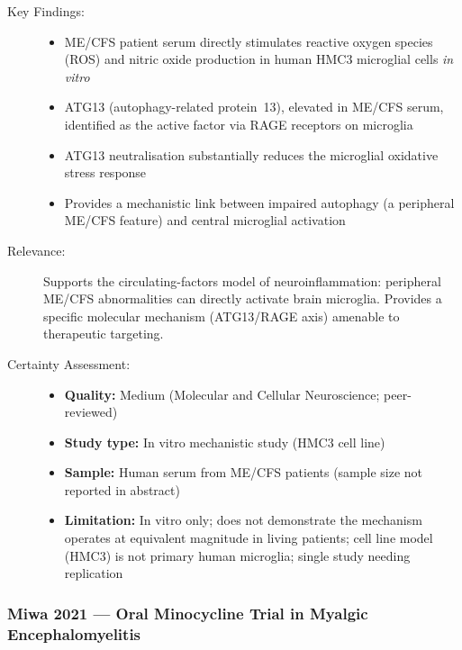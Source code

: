 
\begin{description}
    \item[Key Findings:]
    \begin{itemize}
        \item ME/CFS patient serum directly stimulates reactive oxygen species (ROS) and nitric oxide production in human HMC3 microglial cells \textit{in vitro}
        \item ATG13 (autophagy-related protein~13), elevated in ME/CFS serum, identified as the active factor via RAGE receptors on microglia
        \item ATG13 neutralisation substantially reduces the microglial oxidative stress response
        \item Provides a mechanistic link between impaired autophagy (a peripheral ME/CFS feature) and central microglial activation
    \end{itemize}
    \item[Relevance:] Supports the circulating-factors model of neuroinflammation: peripheral ME/CFS abnormalities can directly activate brain microglia. Provides a specific molecular mechanism (ATG13/RAGE axis) amenable to therapeutic targeting.
    \item[Certainty Assessment:]
    \begin{itemize}
        \item \textbf{Quality:} Medium (Molecular and Cellular Neuroscience; peer-reviewed)
        \item \textbf{Study type:} In vitro mechanistic study (HMC3 cell line)
        \item \textbf{Sample:} Human serum from ME/CFS patients (sample size not reported in abstract)
        \item \textbf{Limitation:} In vitro only; does not demonstrate the mechanism operates at equivalent magnitude in living patients; cell line model (HMC3) is not primary human microglia; single study needing replication
    \end{itemize}
\end{description}

\subsubsection*{Miwa 2021 --- Oral Minocycline Trial in Myalgic Encephalomyelitis}


